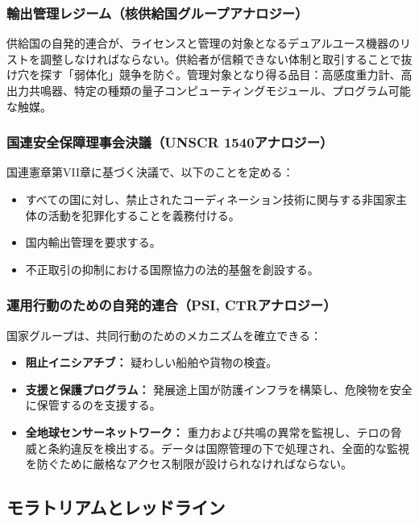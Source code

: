 \documentclass[12pt,a4paper]{article}
\theoremstyle{remark}
\begin{document}
	\subsubsection{輸出管理レジーム（核供給国グループアナロジー）}
	
	供給国の自発的連合が、ライセンスと管理の対象となるデュアルユース機器のリストを調整しなければならない。供給者が信頼できない体制と取引することで抜け穴を探す「弱体化」競争を防ぐ。管理対象となり得る品目：高感度重力計、高出力共鳴器、特定の種類の量子コンピューティングモジュール、プログラム可能な触媒。
	
	\subsubsection{国連安全保障理事会決議（UNSCR 1540アナロジー）}
	
	国連憲章第VII章に基づく決議で、以下のことを定める：
	\begin{itemize}
		\item すべての国に対し、禁止されたコーディネーション技術に関与する非国家主体の活動を犯罪化することを義務付ける。
		\item 国内輸出管理を要求する。
		\item 不正取引の抑制における国際協力の法的基盤を創設する。
	\end{itemize}
	
	\subsubsection{運用行動のための自発的連合（PSI, CTRアナロジー）}
	
	国家グループは、共同行動のためのメカニズムを確立できる：
	\begin{itemize}
		\item \textbf{阻止イニシアチブ：} 疑わしい船舶や貨物の検査。
		\item \textbf{支援と保護プログラム：} 発展途上国が防護インフラを構築し、危険物を安全に保管するのを支援する。
		\item \textbf{全地球センサーネットワーク：} 重力および共鳴の異常を監視し、テロの脅威と条約違反を検出する。データは国際管理の下で処理され、全面的な監視を防ぐために厳格なアクセス制限が設けられなければならない。
	\end{itemize}
	
	\subsection{モラトリアムとレッドライン}
	\label{subsec:redlines}
	
\end{document}
